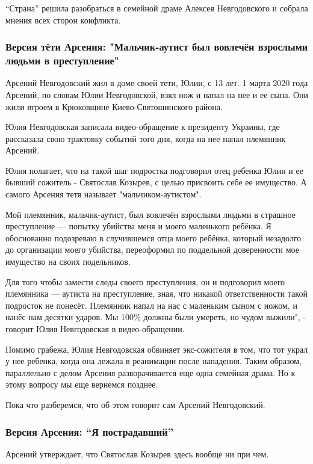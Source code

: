 “Страна” решила разобраться в семейной драме Алексея Невгодовского и собрала
мнения всех сторон конфликта.

\subsubsection{Версия тёти Арсения: "Мальчик-аутист был вовлечён взрослыми людьми в преступление"}

Арсений Невгодовский жил в доме своей тети, Юлии, с 13 лет. 1 марта 2020 года
Арсений, по словам Юлии Невгодовской, взял нож и напал на нее и ее сына. Они
жили втроем в Крюковщине Киево-Святошинского района.

Юлия Невгодовская записала видео-обращение к президенту Украины, где рассказала
свою трактовку событий того дня, когда на нее напал племянник Арсений. 

Юлия полагает, что на такой шаг подростка подговорил отец ребенка Юлии и ее
бывший сожитель - Святослав Козырев, с целью присвоить себе ее имущество. А
самого Арсения тетя называет "мальчиком-аутистом".

Мой племянник, мальчик-аутист, был вовлечён взрослыми людьми в страшное
преступление --- попытку убийства меня и моего маленького ребёнка. Я обоснованно
подозреваю в случившемся отца моего ребёнка, который незадолго до организации
моего убийства, переоформил по поддельной доверенности мое имущество на своих
подельников.

Для того чтобы замести следы своего преступления, он и подговорил моего
племянника --- аутиста  на преступление, зная, что никакой ответственности такой
подросток не понесёт. Племянник напал на нас с маленьким сыном с ножом, и нанёс
нам десятки ударов. Мы 100\% должны были умереть, но чудом выжили", - говорит
Юлия Невгодовская в видео-обращении. 

Помимо грабежа, Юлия Невгодовская обвиняет экс-сожителя в том, что тот украл у
нее ребенка, когда она лежала в реанимации после нападения. Таким образом,
параллельно с делом Арсения разворачивается еще одна семейная драма. Но к этому
вопросу мы еще вернемся позднее. 

Пока что разберемся, что об этом говорит сам Арсений Невгодовский. 

\subsubsection{Версия Арсения: “Я пострадавший”}

Арсений утверждает, что Святослав Козырев здесь вообще ни при чем.

